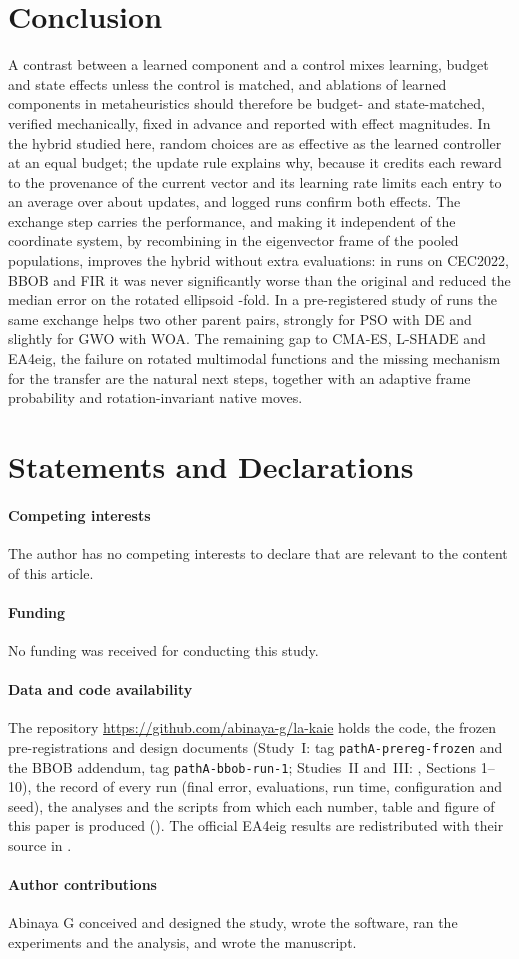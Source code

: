 \section{Conclusion}
\label{sec:conclusion}
A contrast between a learned component and a control mixes learning, budget and state effects unless the control is matched,
and ablations of learned components in metaheuristics should therefore be budget- and state-matched, verified mechanically,
fixed in advance and reported with effect magnitudes. In the hybrid studied here, random choices are as effective as the
learned controller at an equal budget; the update rule explains why, because it credits each reward to the provenance of the
current vector and its learning rate limits each entry to an average over about  updates, and logged runs
confirm both effects. The exchange step carries the performance, and making it independent of the coordinate system, by
recombining in the eigenvector frame of the pooled populations, improves the hybrid without extra evaluations: in
 runs on CEC2022, BBOB and FIR it was never significantly worse than the original and reduced the median
error on the rotated ellipsoid -fold. In a pre-registered study of  runs the same exchange
helps two other parent pairs, strongly for PSO with DE and slightly for GWO with WOA. The remaining gap to CMA-ES, L-SHADE and
EA4eig, the failure on rotated multimodal functions and the missing mechanism for the transfer are the natural next steps,
together with an adaptive frame probability and rotation-invariant native moves.

\FloatBarrier
\section*{Statements and Declarations}
\paragraph{Competing interests} The author has no competing interests to declare that are relevant to the content of this article.
\paragraph{Funding} No funding was received for conducting this study.
\paragraph{Data and code availability} The repository \url{https://github.com/abinaya-g/la-kaie} holds the code, the frozen
pre-registrations and design documents (Study~I: tag \texttt{pathA-prereg-frozen} and the BBOB addendum, tag
\texttt{pathA-bbob-run-1}; Studies~II and~III: , Sections 1--10), the record of every
run (final error, evaluations, run time, configuration and seed), the analyses and the scripts from which each number, table
and figure of this paper is produced (). The official EA4eig results are redistributed with
their source in .
\paragraph{Author contributions} Abinaya G conceived and designed the study, wrote the software, ran the experiments and the
analysis, and wrote the manuscript.
